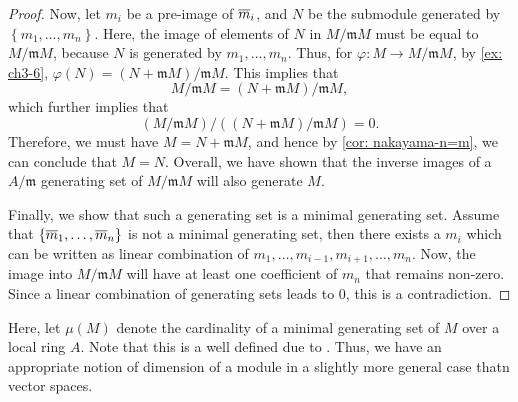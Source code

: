 \begin{proof}
Now, let $m_{i}$ be a pre-image of $\overline{m}_{i}$, and $N$ be the submodule generated by $\left\{m_{1}, \ldots, m_{n}\right\}$. 
Here, the image of elements of $N$ in $M / \mathfrak{m} M$ must be equal to $M / \mathfrak{m} M$, because $N$ is generated by $m_{1}, \ldots, m_{n}$. Thus, for $\varphi: M \longrightarrow M / \mathfrak{m} M$, by \cref{ex: ch3-6}, $\varphi(N)=(N+\mathfrak{m} M) / \mathfrak{m} M$. This implies that 
\[
M / \mathfrak{m} M=(N+\mathfrak{m} M) / \mathfrak{m} M,
\]
which further implies that 
\[
(M / \mathfrak{m} M) /((N+\mathfrak{m} M) / \mathfrak{m} M)=0.
\]
Therefore, we must have $M=N+\mathfrak{m} M$, and hence by \cref{cor: nakayama-n=m}, we can conclude that $M=N$. Overall, we have shown that the inverse images of a $A / \mathfrak{m}$ generating set of $M / \mathfrak{m} M$ will also generate $M$. 

Finally, we show that such a generating set is a minimal generating set. Assume that $\left\{\overline{m}_{1}, \ldots, \overline{m}_{n}\right\}$ is not a minimal generating set, then there exists a $m_{i}$ which can be written as linear combination of $m_{1}, \ldots, m_{i-1}, m_{i+1}, \ldots, m_n$. Now, the image into $M / \mathfrak{m} M$ will have at least one coefficient of $m_{n}$ that remains non-zero. Since a linear combination of generating sets leads to 0, this is a contradiction.
\end{proof}

 Here, let $\mu(M)$ denote the cardinality of a minimal generating set of $M$ over a local ring $A$. Note that this is a well defined due to \REF. Thus, we have an appropriate notion of dimension of a module in a slightly more general case thatn vector spaces.
\newpage
